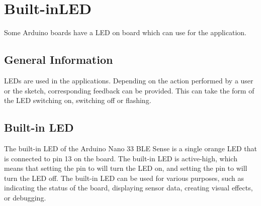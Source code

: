 %
%



\chapter{Built-inLED}

Some Arduino boards have a LED on board which can use for the application. \cite{ArduinoNanoGetStarted:2024,Arduino:2023a,Arduino:2023}

\section{General Information}

LEDs are used in the applications. Depending on the action performed by a user or the sketch, corresponding feedback can be provided. This can take the form of the LED switching on, switching off or flashing. \cite{Kurniawan:2021b}




\section{Built-in LED}

The built-in LED of the Arduino Nano 33 BLE Sense is a single orange LED that is connected to pin 13 on the board. The built-in LED is active-high, which means that setting the pin to  will turn the LED on, and setting the pin to  will turn the LED off. The built-in LED can be used for various purposes, such as indicating the status of the board, displaying sensor data, creating visual effects, or debugging. \cite{Arduino:2023a,Arduino:2023,ArduinoNano33Manual:2022}


\bigskip



